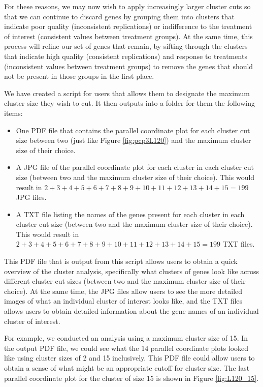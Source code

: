 \documentclass[11pt,a4paper,oldfontcommands,openany]{memoir}
\numberwithin{equation}{section} %
\begin{document}
For these reasons, we may now wish to apply increasingly larger cluster cuts so that we can continue to discard genes by grouping them into clusters that indicate poor quality (inconsistent replications) or indifference to the treatment of interest (consistent values between treatment groups). At the same time, this process will refine our set of genes that remain, by sifting through the clusters that indicate high quality (consistent replications) and response to treatments (inconsistent values between treatment groups) to remove the genes that should not be present in those groups in the first place.

We have created a script for users that allows them to designate the maximum cluster size they wish to cut. It then outputs into a folder for them the following items:

\begin{itemize}

\item One PDF file that contains the parallel coordinate plot for each cluster cut size between two (just like Figure \ref{fig:pcp3L120}) and the maximum cluster size of their choice.

\item A JPG file of the parallel coordinate plot for each cluster in each cluster cut size (between two and the maximum cluster size of their choice). This would result in $2+3+4+5+6+7+8+9+10+11+12+13+14+15=199$ JPG files.

\item A TXT file listing the names of the genes present for each cluster in each cluster cut size (between two and the maximum cluster size of their choice). This would result in $2+3+4+5+6+7+8+9+10+11+12+13+14+15=199$ TXT files.

\end{itemize}

This PDF file that is output from this script allows users to obtain a quick overview of the cluster analysis, specifically what clusters of genes look like across different cluster cut sizes (between two and the maximum cluster size of their choice). At the same time, the JPG files allow users to see the more detailed images of what an individual cluster of interest looks like, and the TXT files allows users to obtain detailed information about the gene names of an individual cluster of interest.

For example, we conducted an analysis using a maximum cluster size of 15. In the output PDF file, we could see what the 14 parallel coordinate plots looked like using cluster sizes of 2 and 15 inclusively. This PDF file could allow users to obtain a sense of what might be an appropriate cutoff for cluster size. The last parallel coordinate plot for the cluster of size 15 is shown in Figure \ref{fig:L120_15}.
\end{document}
